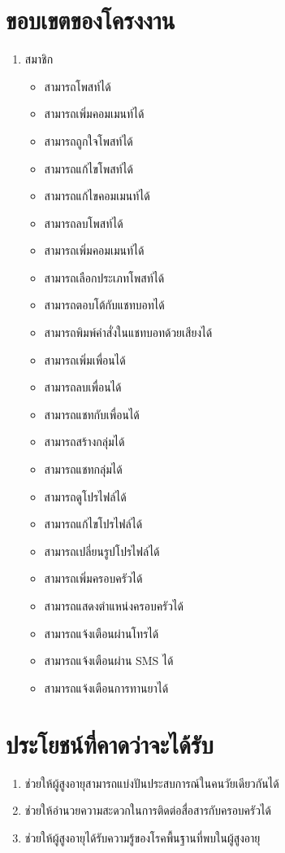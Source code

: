 \section{ขอบเขตของโครงงาน}
\begin{enumerate}[label=1.3.\arabic*]
	\item สมาชิก
	 \begin{itemize}
		 	\item สามารถโพสท์ได้
		 	\item สามารถเพิ่มคอมเมนท์ได้
		 	\item สามารถถูกใจโพสท์ได้
		 	\item สามารถแก้ไขโพสท์ได้
		 	\item สามารถแก้ไขคอมเมนท์ได้
		 	\item สามารถลบโพสท์ได้
		 	\item สามารถเพิ่มคอมเมนท์ได้
		 	\item สามารถเลือกประเภทโพสท์ได้
		 	\item สามารถตอบโต้กับแชทบอทได้
		 	\item สามารถพิมพ์คำสั่งในแชทบอทด้วยเสียงได้
		 	\item สามารถเพิ่มเพื่อนได้
		 	\item สามารถลบเพื่อนได้
		 	\item สามารถแชทกับเพื่อนได้
		 	\item สามารถสร้างกลุ่มได้
		 	\item สามารถแชทกลุ่มได้
		 	\item สามารถดูโปรไฟล์ได้
		 	\item สามารถแก้ไขโปรไฟล์ได้
		 	\item สามารถเปลี่ยนรูปโปรไฟล์ได้
		 	\item สามารถเพิ่มครอบครัวได้
		 	\item สามารถแสดงตำแหน่งครอบครัวได้
		 	\item สามารถแจ้งเตือนผ่านโทรได้
		 	\item สามารถแจ้งเตือนผ่าน SMS ได้
		 	\item สามารถแจ้งเตือนการทานยาได้
	 \end{itemize}
\end{enumerate}
\section{ประโยชน์ที่คาดว่าจะได้รับ}
\begin{enumerate}
	\item ช่วยให้ผู้สูงอายุสามารถแบ่งปันประสบการณ์ในคนวัยเดียวกันได้
	\item ช่วยให้อำนวยความสะดวกในการติดต่อสื่อสารกับครอบครัวได้
	\item ช่วยให้ผู้สูงอายุได้รับความรู้ของโรคพื้นฐานที่พบในผู้สูงอายุ
\end{enumerate}
